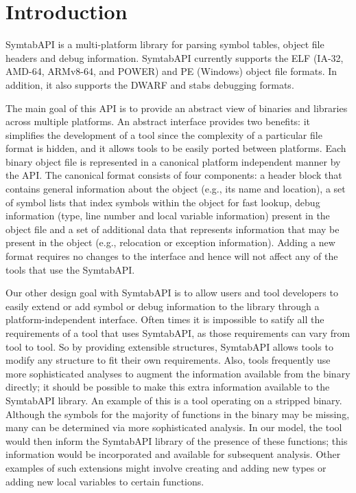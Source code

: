 \section{Introduction}
\label{sec:intro}

SymtabAPI is a multi-platform library for parsing symbol tables,
object file headers and debug information. SymtabAPI currently
supports the ELF (IA-32, AMD-64, ARMv8-64, and POWER) and PE
(Windows) object file formats. In addition, it also supports the DWARF
and stabs debugging formats.

The main goal of this API is to provide an abstract view of binaries and
libraries across multiple platforms. An abstract interface provides two
benefits: it simplifies the development of a tool since the complexity of a
particular file format is hidden, and it allows tools to be easily ported
between platforms. Each binary object file is represented in a canonical
platform independent manner by the API. The canonical format consists of four
components: a header block that contains general information about the object
(e.g., its name and location), a set of symbol lists that index symbols within
the object for fast lookup, debug information (type, line number and local
variable information) present in the object file and a set of additional data
that represents information that may be present in the object (e.g., relocation
or exception information). Adding a new format requires no changes to the
interface and hence will not affect any of the tools that use the SymtabAPI. 

Our other design goal with SymtabAPI is to allow users and tool developers to
easily extend or add symbol or debug information to the library through a
platform-independent interface. Often times it is impossible to satify all the
requirements of a tool that uses SymtabAPI, as those requirements can vary from
tool to tool. So by providing extensible structures, SymtabAPI allows tools to
modify any structure to fit their own requirements. Also, tools frequently use
more sophisticated analyses to augment the information available from the binary
directly; it should be possible to make this extra information available to the
SymtabAPI library. An example of this is a tool operating on a stripped binary.
Although the symbols for the majority of functions in the binary may be missing,
many can be determined via more sophisticated analysis. In our model, the tool
would then inform the SymtabAPI library of the presence of these functions; this
information would be incorporated and available for subsequent analysis. Other
examples of such extensions might involve creating and adding new types or
adding new local variables to certain functions.
